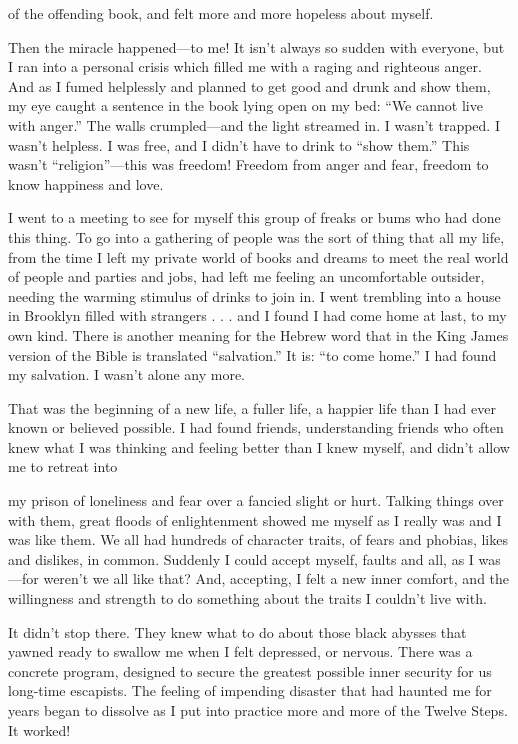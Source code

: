 \begin{biblechapter}
of the offending book, and felt more and more hopeless about myself.

Then the miracle happened—to me! It isn’t always so sudden with everyone, but I ran into a personal crisis which filled me with a raging and righteous anger. And as I fumed helplessly and planned to get good and drunk and show them, my eye caught a sentence in the book lying open on my bed: “We cannot live with anger.” The walls crumpled—and the light streamed in. I wasn’t trapped. I wasn’t helpless. I was free, and I didn’t have to drink to “show them.” This wasn’t “religion”—this was freedom! Freedom from anger and fear, freedom to know happiness and love.

I went to a meeting to see for myself this group of freaks or bums who had done this thing. To go into a gathering of people was the sort of thing that all my life, from the time I left my private world of books and dreams to meet the real world of people and parties and jobs, had left me feeling an uncomfortable outsider, needing the warming stimulus of drinks to join in. I went trembling into a house in Brooklyn filled with strangers . . . and I found I had come home at last, to my own kind. There is another meaning for the Hebrew word that in the King James version of the Bible is translated “salvation.” It is: “to come home.” I had found my salvation. I wasn’t alone any more.

That was the beginning of a new life, a fuller life, a happier life than I had ever known or believed possible. I had found friends, understanding friends who often knew what I was thinking and feeling better than I knew myself, and didn’t allow me to retreat into

my prison of loneliness and fear over a fancied slight or hurt. Talking things over with them, great floods of enlightenment showed me myself as I really was and I was like them. We all had hundreds of character traits, of fears and phobias, likes and dislikes, in common. Suddenly I could accept myself, faults and all, as I was—for weren’t we all like that? And, accepting, I felt a new inner comfort, and the willingness and strength to do something about the traits I couldn’t live with.

It didn’t stop there. They knew what to do about those black abysses that yawned ready to swallow me when I felt depressed, or nervous. There was a concrete program, designed to secure the greatest possible inner security for us long-time escapists. The feeling of impending disaster that had haunted me for years began to dissolve as I put into practice more and more of the Twelve Steps. It worked!


\end{biblechapter}

